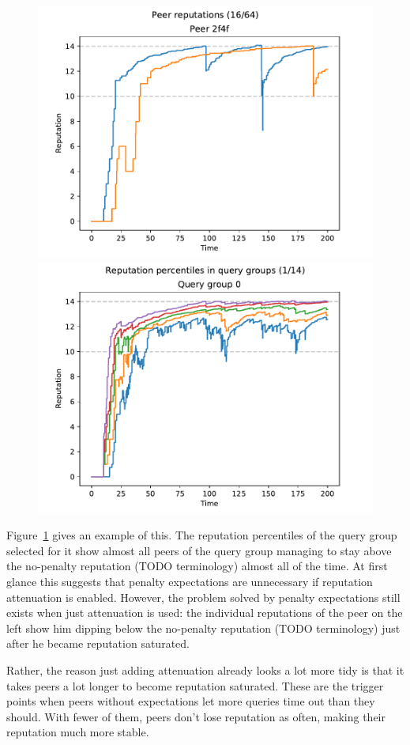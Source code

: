 \begin{figure}[t]
\centering
\includegraphics[width=0.5\columnwidth]{figures/expectations_off_peer_reps_16_of_64}%
\includegraphics[width=0.5\columnwidth]{figures/expectations_off_rep_percs_1_of_14}
\label{fig:penalty_expectations_off_peer_reps_percs}
\end{figure}

Figure~\ref{fig:penalty_expectations_off_peer_reps_percs} gives an example of
this. The reputation percentiles of the query group selected for it show almost
all peers of the query group managing to stay above the no-penalty reputation
(TODO terminology) almost all of the time. At first glance this suggests that
penalty expectations are unnecessary if reputation attenuation is enabled.
However, the problem solved by penalty expectations still exists when just
attenuation is used: the individual reputations of the peer on the left show him
dipping below the no-penalty reputation (TODO terminology) just after he became
reputation saturated.

Rather, the reason just adding attenuation already looks a lot more tidy is that
it takes peers a lot longer to become reputation saturated. These are the
trigger points when peers without expectations let more queries time out than
they should. With fewer of them, peers don't lose reputation as often, making
their reputation much more stable.

